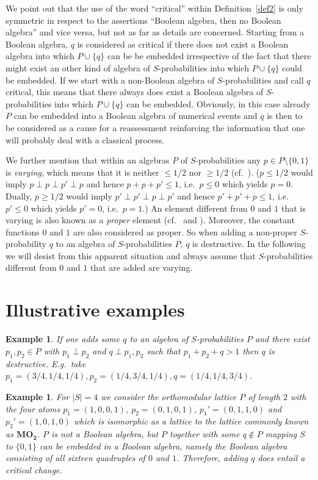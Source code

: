 \documentclass[12pt]{article}
\newtheorem{example}[theorem]{Example}
\begin{document}
We point out that the use of the word ``critical'' within Definition~\ref{def2} is only symmetric in respect to the assertions ``Boolean algebra, then no Boolean algebra'' and vice versa, but not as far as details are concerned. Starting from a Boolean algebra, $q$ is considered as critical if there does not exist a Boolean algebra into which $P\cup\{q\}$ can be be embedded irrespective of the fact that there might exist an other kind of algebra of $S$-probabilities into which $P\cup\{q\}$ could be embedded. If we start with a non-Boolean algebra of $S$-probabilities and call $q$ critical, this means that there always does exist a Boolean algebra of $S$-probabilities into which $P\cup\{q\}$ can be embedded. Obviously, in this case already $P$ can be embedded into a Boolean algebra of numerical events and $q$ is then to be considered as a cause for a reassessment reinforcing the information that one will probably deal with a classical process.

We further mention that within an algebras $P$ of $S$-probabilities any $p\in P\setminus\{0,1\}$ is {\em varying}, which means that it is neither $\le1/2$ nor $\ge1/2$ (cf.\ \cite{DDL}). ($p\le1/2$ would imply $p\perp p\perp p'\perp p$ and hence $p+p+p'\le1$, i.e.\ $p\le0$ which yields $p=0$. Dually, $p\ge1/2$ would imply $p'\perp p'\perp p\perp p'$ and hence $p'+p'+p\le1$, i.e. $p'\le0$ which yields $p'=0$, i.e.\ $p=1$.) An element different from $0$ and $1$ that is varying is also known as a {\em proper} element (cf.\ \cite{DL18} and \cite{DL21}). Moreover, the constant functions $0$ and $1$ are also considered as proper. So when adding a non-proper $S$-probability $q$ to an algebra of $S$-probabilities $P$, $q$ is destructive. In the following we will desist from this apparent situation and always assume that $S$-probabilities different from $0$ and $1$ that are added are varying.

\section{Illustrative examples}

\begin{example}
If one adds some $q$ to an algebra of $S$-probabilities $P$ and there exist $p_1,p_2\in P$ with $p_1\perp p_2$ and $q\perp p_1,p_2$ such that $p_1+p_2+q>1$ then $q$ is destructive. E.g.\ take $p_1=(3/4,1/4,1/4), p_2=(1/4,3/4,1/4), q=(1/4,1/4,3/4)$.
\end{example}

\begin{example}\label{ex1}
For $|S|= 4$ we consider the orthomodular lattice $P$ of length $2$ with the four atoms $p_1=(1,0,0,1)$, $p_2=(0,1,0,1)$, $p_1'=(0,1,1,0)$ and $p_2'=(1,0,1,0)$ which is isomorphic as a lattice to the lattice commonly known as $\mathbf{MO_2}$. $P$ is not a Boolean algebra, but $P$ together with some $q\notin P$ mapping $S$ to $\{0,1\}$ can be embedded in a Boolean algebra, namely the Boolean algebra consisting of all sixteen quadruples of $0$ and $1$. Therefore, adding $q$ does entail a critical change.
\end{example}
\end{document}
